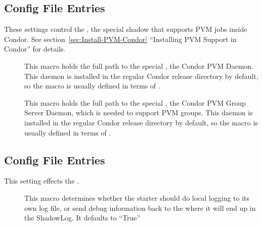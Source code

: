 \subsection{ Config File Entries}
\label{sec:Shadow-PVM-Config-File-Entries}

These settings control the , the special shadow
that supports PVM jobs inside Condor.  See
section~\ref{sec:Install-PVM-Condor} ``Installing PVM Support in
Condor'' for details.

\begin{description}

\item[] \label{param:PvmD}  This macro holds the full path
  to the special , the Condor PVM Daemon.  This daemon is
  installed in the regular Condor release directory by default, so the
  macro is usually defined in terms of .
  
\item[] \label{param:PvmGS} This macro holds the full
  path to the special , the Condor PVM Group Server
  Daemon, which is needed to support PVM groups.  This daemon is
  installed in the regular Condor release directory by default, so the
  macro is usually defined in terms of .

\end{description}

\subsection{ Config File Entries}
\label{sec:Starter-Config-File-Entries}

This setting effects the .

\begin{description}

\item[]
  \label{param:StarterLocalLogging} This macro determines whether the
  starter should do local logging to its own log file, or send debug
  information back to the  where it will end up in the
  ShadowLog.  It defaults to ``True''

\end{description}

